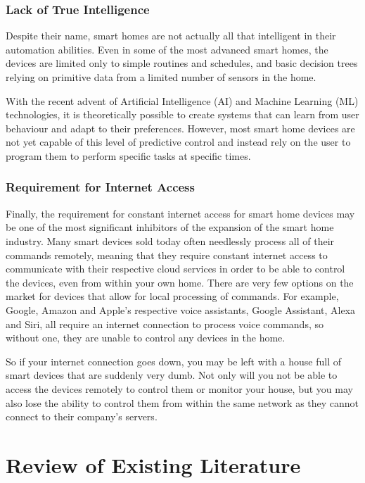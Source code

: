 \subsubsection{Lack of True Intelligence}
Despite their name, smart homes are not actually all that intelligent in their automation abilities.
Even in some of the most advanced smart homes, the devices are limited only to simple routines and schedules, and basic decision trees relying on primitive data from a limited number of sensors in the home.

With the recent advent of Artificial Intelligence (AI) and Machine Learning (ML) technologies, it is theoretically possible to create systems that can learn from user behaviour and adapt to their preferences.
However, most smart home devices are not yet capable of this level of predictive control and instead rely on the user to program them to perform specific tasks at specific times.

\subsubsection{Requirement for Internet Access}
Finally, the requirement for constant internet access for smart home devices may be one of the most significant inhibitors of the expansion of the smart home industry.
Many smart devices sold today often needlessly process all of their commands remotely, meaning that they require constant internet access to communicate with their respective cloud services in order to be able to control the devices, even from within your own home.
There are very few options on the market for devices that allow for local processing of commands.
For example, Google, Amazon and Apple's respective voice assistants, Google Assistant, Alexa and Siri, all require an internet connection to process voice commands, so without one, they are unable to control any devices in the home.

So if your internet connection goes down, you may be left with a house full of smart devices that are suddenly very dumb.
Not only will you not be able to access the devices remotely to control them or monitor your house, but you may also lose the ability to control them from within the same network as they cannot connect to their company's servers.

\section{Review of Existing Literature}


